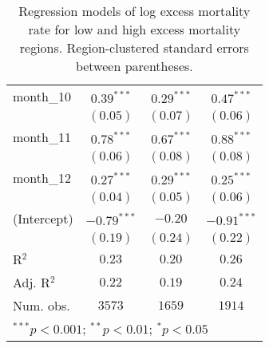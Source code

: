 \begin{table}[h!]
\begin{center}
\begin{small}
\begin{tabular}{l c c c}
month\_10      & $0.39^{***}$  & $0.29^{***}$  & $0.47^{***}$  \\
               & $(0.05)$      & $(0.07)$      & $(0.06)$      \\
month\_11      & $0.78^{***}$  & $0.67^{***}$  & $0.88^{***}$  \\
               & $(0.06)$      & $(0.08)$      & $(0.08)$      \\
month\_12      & $0.27^{***}$  & $0.29^{***}$  & $0.25^{***}$  \\
               & $(0.04)$      & $(0.05)$      & $(0.06)$      \\
(Intercept)    & $-0.79^{***}$ & $-0.20$       & $-0.91^{***}$ \\
               & $(0.19)$      & $(0.24)$      & $(0.22)$      \\
\hline
R$^2$          & $0.23$        & $0.20$        & $0.26$        \\
Adj. R$^2$     & $0.22$        & $0.19$        & $0.24$        \\
Num. obs.      & $3573$        & $1659$        & $1914$        \\
\hline
\multicolumn{4}{l}{\tiny{$^{***}p<0.001$; $^{**}p<0.01$; $^{*}p<0.05$}}
\end{tabular}
\end{small}
\caption{Regression models of log excess mortality rate for low and high excess mortality regions. Region-clustered standard errors between parentheses.}
\label{tab:hilomodels}
\end{center}
\end{table}
